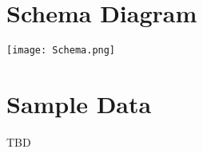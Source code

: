\documentclass{article}
\begin{document}
\vspace{0.5cm}

\section{Schema Diagram}

\begin{tcolorbox}[colback=secondarycolor, colframe=primarycolor, arc=5mm]

\begin{center}
\vspace{0.5cm}
 \texttt{[image: Schema.png]}
\end{center}
\end{tcolorbox}

\vspace{0.5cm}

\section{Sample Data}

TBD

\end{document}
